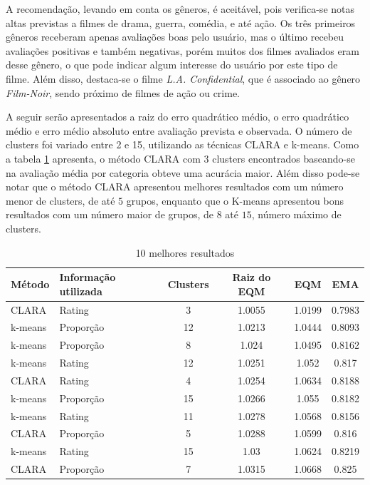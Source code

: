 \documentclass[12pt,a4paper,header]{abnt}
\begin{document}
A recomendação, levando em conta os gêneros, é aceitável, pois verifica-se notas altas previstas a filmes de drama, guerra, comédia, e até ação. Os três primeiros gêneros receberam apenas avaliações boas pelo usuário, mas o último recebeu avaliações positivas e também negativas, porém muitos dos filmes avaliados eram desse gênero, o que pode indicar algum interesse do usuário por este tipo de filme. Além disso, destaca-se o filme \textit{L.A. Confidential}, que é associado ao gênero \textit{Film-Noir}, sendo próximo de filmes de ação ou crime.

A seguir serão apresentados a raiz do erro quadrático médio, o erro quadrático médio e erro médio absoluto entre avaliação prevista e observada. O número de clusters foi variado entre 2 e 15, utilizando as técnicas CLARA e k-means. Como a tabela \ref{top10_erros_rec} apresenta, o método CLARA com 3 clusters encontrados baseando-se na avaliação média por categoria obteve uma acurácia maior. Além disso pode-se notar que o método CLARA apresentou melhores resultados com um número menor de clusters, de até $5$ grupos, enquanto que o K-means apresentou bons resultados com um número maior de grupos, de $8$ até $15$, número máximo de clusters.

\begin{longtable}{@{}llcccc@{}}
\caption{10 melhores resultados}
\label{top10_erros_rec}
\\
\toprule
\textbf{Método}   & \textbf{Informação utilizada}   & \textbf{Clusters}   & \textbf{Raiz do EQM}     & \textbf{EQM}             & \textbf{EMA}             \\* \midrule
\endhead
%
\bottomrule
\endfoot
%
\endlastfoot
%
CLARA    & Rating                 & 3          & 1.0055          & 1.0199          & 0.7983          \\
k-means   & Proporção              & 12         & 1.0213          & 1.0444          & 0.8093          \\
k-means   & Proporção              & 8          & 1.024           & 1.0495          & 0.8162          \\
k-means   & Rating                 & 12         & 1.0251          & 1.052           & 0.817           \\
CLARA    & Rating                 & 4          & 1.0254          & 1.0634          & 0.8188          \\
k-means   & Proporção              & 15         & 1.0266          & 1.055           & 0.8182          \\
k-means   & Rating                 & 11         & 1.0278          & 1.0568          & 0.8156          \\
CLARA    & Proporção              & 5          & 1.0288          & 1.0599          & 0.816           \\
k-means   & Rating                 & 15         & 1.03            & 1.0624          & 0.8219          \\
CLARA    & Proporção              & 7          & 1.0315          & 1.0668          & 0.825           \\* \bottomrule
\end{longtable}
\end{document}
